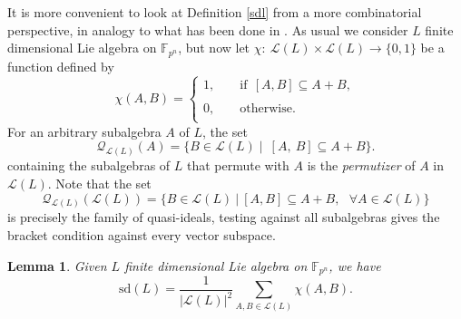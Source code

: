 \documentclass{amsart}
\newtheorem{lemma}[theorem]{Lemma}
\theoremstyle{definition}
\numberwithin{equation}{section}
\begin{document}
It is more convenient to look at Definition \ref{sdl} from a more combinatorial perspective, in analogy to what has been done in \cite{sr1, sr2, or, mt}. As usual we consider $L$ finite dimensional Lie algebra on $\mathbb{F}_{p^n}$, but now let $\chi:\  \mathcal{L}(L)\times \mathcal{L}(L)\longrightarrow \{0,1\}$ be a function defined by 
\begin{equation} \label{charfun}
    \chi(A,B)=\left\{\begin{array}{lcl} 1,&\,\,& \mathrm{if} \   \ [A,B]\subseteq A+B , \\  
\\ 
 0 ,&\,\,& \mathrm{otherwise} . \\
 \end{array}\right.
\end{equation}
For an arbitrary subalgebra  $A$ of $L$, the set 
\begin{equation} \label{permutewithA}
        \mathcal{Q}_{\mathcal{L}(L)}(A) =\{B \in \mathcal{L}  (L)  \mid  \ [A, \  B] \subseteq A+B \}. 
\end{equation}
 containing the subalgebras of $L$ that permute with $A$ is the \textit{permutizer} of $A$ in $\mathcal{L}(L)$. Note that the set \begin{equation}\label{intersection}
\mathcal{Q}_{\mathcal{L}(L)}(\mathcal{L}(L)) =\{B \in \mathcal{L}(L) \ | \ [A,B] \subseteq A+B, \  \ \ \forall A \in \mathcal{L}(L)\} 
\end{equation}
 is precisely the family of quasi-ideals, testing against all subalgebras gives
the bracket condition against every vector subspace. 











\begin{lemma}\label{combinatorialformulat} Given $L$ finite dimensional Lie algebra on $\mathbb{F}_{p^n}$, we have
\[\label{sdviacharfun}
    \mathrm{sd}(L)=\frac{1}{|\mathcal{L}(L)|^2} \underset{A, B\in \mathcal{L}(L) }{\sum} \chi (A,B).
\]    
\end{lemma}
\end{document}
